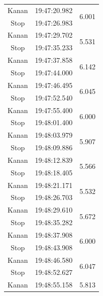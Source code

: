 \begin{longtable}{|c|c|c|}
  Kanan          & 19:47:20.982        & \multirow{2}{*}{6.001}  \\ \cline{1-2}
  Stop           & 19:47:26.983        &                         \\ \hline
  Kanan          & 19:47:29.702        & \multirow{2}{*}{5.531}  \\ \cline{1-2}
  Stop           & 19:47:35.233        &                         \\ \hline
  Kanan          & 19:47:37.858        & \multirow{2}{*}{6.142}  \\ \cline{1-2}
  Stop           & 19:47:44.000        &                         \\ \hline
  Kanan          & 19:47:46.495        & \multirow{2}{*}{6.045}  \\ \cline{1-2}
  Stop           & 19:47:52.540        &                         \\ \hline
  Kanan          & 19:47:55.400        & \multirow{2}{*}{6.000}  \\ \cline{1-2}
  Stop           & 19:48:01.400        &                         \\ \hline
  Kanan          & 19:48:03.979        & \multirow{2}{*}{5.907}  \\ \cline{1-2}
  Stop           & 19:48:09.886        &                         \\ \hline
  Kanan          & 19:48:12.839        & \multirow{2}{*}{5.566}  \\ \cline{1-2}
  Stop           & 19:48:18.405        &                         \\ \hline
  Kanan          & 19:48:21.171        & \multirow{2}{*}{5.532}  \\ \cline{1-2}
  Stop           & 19:48:26.703        &                         \\ \hline
  Kanan          & 19:48:29.610        & \multirow{2}{*}{5.672}  \\ \cline{1-2}
  Stop           & 19:48:35.282        &                         \\ \hline
  Kanan          & 19:48:37.908        & \multirow{2}{*}{6.000}  \\ \cline{1-2}
  Stop           & 19:48:43.908        &                         \\ \hline
  Kanan          & 19:48:46.580        & \multirow{2}{*}{6.047}  \\ \cline{1-2}
  Stop           & 19:48:52.627        &                         \\ \hline
  Kanan          & 19:48:55.158        & \multirow{2}{*}{5.813}  \\ \cline{1-2}

\end{longtable}
